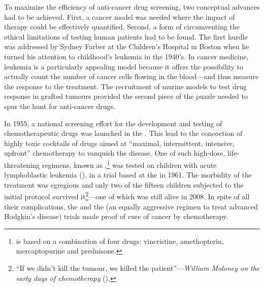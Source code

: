 To maximize the efficiency of anti-cancer drug screening, two conceptual
advances had to be achieved.  First, a cancer model was needed where the impact
of therapy could be effectively quantified.  Second, a form of circumventing the
ethical limitations of testing human patients had to be found.  The first hurdle
was addressed by Sydney Farber at the Children's Hospital in Boston when he
turned his attention to childhood's leukemia in the
1940's.\cite{devita_history_2008} In cancer medicine, leukemia is a particularly
appealing model because it offers the possibility to actually count the number
of cancer cells flowing in the blood---and thus measure the response to the
treatment.  The recruitment of murine models to test drug response in grafted
tumours provided the second piece of the puzzle needed to spur the hunt for
anti-cancer drugs.\cite{clowes_further_1905}

In 1955, a national screening effort for the development and testing of
chemotherapeutic drugs was launched in the .  This lead to the
concoction of highly toxic cocktails of drugs aimed at ``maximal, intermittent,
intensive, upfront'' chemotherapy to vanquish the
disease.\cite{frei_curative_1985} One of such high-dose, life-threatening
regimens, known as ,\footnote{ is based on a
  combination of four drugs: vincristine, amethopterin, mercaptopurine and
  prednisone.} was tested on children with acute lymphoblastic leukemia
(), in a trial based at the  in 1961.  The
morbidity of the treatment was egregious and only two of the fifteen children
subjected to the initial protocol survived it\footnote{``If we didn't kill the
  tumour, we killed the patient''---\emph{William Moloney on the early days of
    chemotherapy} (\citealp{moloney_pioneering_1997}).}---one of which was still
alive in 2008.\cite{mukherjee_emperor_2011} In spite of all their complications,
the \cite{frei_effectiveness_1965} and the
\cite{devita_combination_1970} (an equally aggressive regimen to
treat advanced Hodgkin's disease) trials made proof of cure of cancer by
chemotherapy.

